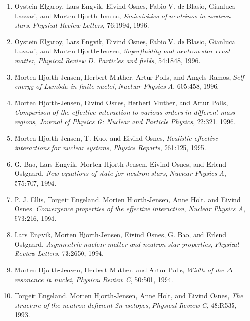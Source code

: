 \documentclass[%
oneside,                 %
final,                   %
10pt]{article}
\begin{document}
\begin{enumerate}
\item Oystein Elgaroy, Lars Engvik, Eivind Osnes, Fabio V. de Blasio, Gianluca Lazzari, and Morten Hjorth-Jensen, \emph{Emissivities of neutrinos in neutron stars},  \emph{Physical Review Letters}, 76:1994, 1996. 

\item Oystein Elgaroy, Lars Engvik, Eivind Osnes, Fabio V. de Blasio, Gianluca   Lazzari, and Morten Hjorth-Jensen, \emph{Superfluidity and neutron star crust matter},  \emph{Physical Review D. Particles and fields}, 54:1848, 1996. 

\item Morten Hjorth-Jensen, Herbert Muther, Artur Polls, and Angels Ramos, \emph{Self-energy of $Lambda$ in finite nuclei},  \emph{Nuclear Physics A}, 605:458, 1996. 

\item Morten Hjorth-Jensen, Eivind Osnes, Herbert Muther, and Artur Polls, \emph{Comparison of the effective interaction to various orders in   different mass regions}, \emph{Journal of Physics G: Nuclear and Particle Physics}, 22:321,   1996. 

\item Morten Hjorth-Jensen, T. Kuo, and Eivind Osnes, \emph{Realistic effective interactions for nuclear systems},  \emph{Physics Reports}, 261:125, 1995. 

\item G. Bao, Lars Engvik, Morten Hjorth-Jensen, Eivind Osnes, and Erlend Ostgaard, \emph{New equations of state for neutron stars},  \emph{Nuclear Physics A}, 575:707, 1994. 

\item P. J. Ellis, Torgeir Engeland, Morten Hjorth-Jensen, Anne Holt, and Eivind   Osnes, \emph{Convergence properties of the effective interaction},  \emph{Nuclear Physics A}, 573:216, 1994. 

\item Lars Engvik, Morten Hjorth-Jensen, Eivind Osnes, G. Bao, and Erlend Ostgaard, \emph{Asymmetric nuclear matter and neutron star properties},  \emph{Physical Review Letters}, 73:2650, 1994. 

\item Morten Hjorth-Jensen, Herbert Muther, and Artur Polls, \emph{Width of the $\Delta$ resonance in nuclei},  \emph{Physical Review C}, 50:501, 1994. 

\item Torgeir Engeland, Morten Hjorth-Jensen, Anne Holt, and Eivind Osnes, \emph{The structure of the neutron deficient Sn isotopes},  \emph{Physical Review C}, 48:R535, 1993. 


\end{enumerate}
\end{document}
